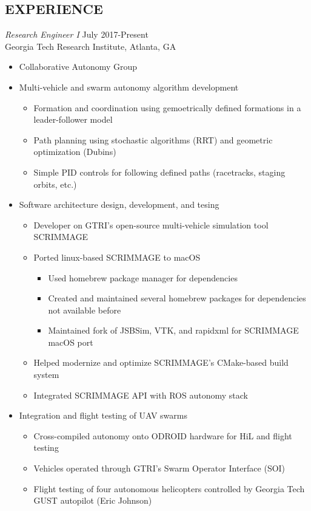 \documentclass[margin]{res} %
\begin{document}
\begin{resume}
\section{EXPERIENCE}

{\sl Research Engineer I} \hfill July 2017-Present \\
Georgia Tech Research Institute, Atlanta, GA
\begin{itemize} \itemsep -2pt %
\item Collaborative Autonomy Group
\item Multi-vehicle and swarm autonomy algorithm development
\vspace{-2mm}
	\begin{itemize}
	\item Formation and coordination using gemoetrically defined formations in a leader-follower model
	\item Path planning using stochastic algorithms (RRT) and geometric optimization (Dubins)
	\item Simple PID controls for following defined paths (racetracks, staging orbits, etc.)
	\end{itemize}
\item Software architecture design, development, and tesing
\vspace{-2mm}
	\begin{itemize}
	\item Developer on GTRI's open-source multi-vehicle simulation tool SCRIMMAGE
	\item Ported linux-based SCRIMMAGE to macOS
		\begin{itemize}
		\item Used homebrew package manager for dependencies
		\item Created and maintained several homebrew packages for dependencies not available before
		\item Maintained fork of JSBSim, VTK, and rapidxml for SCRIMMAGE macOS port
		\end{itemize}
	\item Helped modernize and optimize SCRIMMAGE's CMake-based build system
	\item Integrated SCRIMMAGE API with ROS autonomy stack

	\end{itemize}
\item Integration and flight testing of UAV swarms
\vspace{-2mm}
	\begin{itemize}
	\item Cross-compiled autonomy onto ODROID hardware for HiL and flight testing
	\item Vehicles operated through GTRI's Swarm Operator Interface (SOI)
	\item Flight testing of four autonomous helicopters controlled by Georgia Tech GUST autopilot (Eric Johnson)
	\end{itemize}
\end{itemize}


\end{resume}
\end{document}
